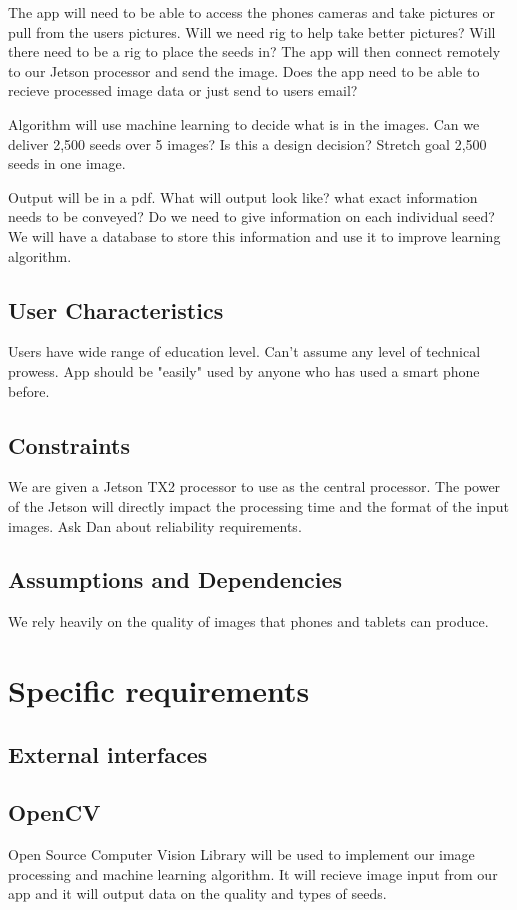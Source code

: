 \documentclass[onecolumn, draftclsnofoot,10pt, compsoc]{IEEEtran}
\begin{document}
The app will need to be able to access the phones cameras and take pictures or pull from the users pictures.
Will we need rig to help take better pictures?
Will there need to be a rig to place the seeds in?
The app will then connect remotely to our Jetson processor and send the image.
Does the app need to be able to recieve processed image data or just send to users email?

Algorithm will use machine learning to decide what is in the images.
Can we deliver 2,500 seeds over 5 images?
Is this a design decision?
Stretch goal 2,500 seeds in one image.

Output will be in a pdf.
What will output look like?
what exact information needs to be conveyed?
Do we need to give information on each individual seed?
We will have a database to store this information and use it to improve learning algorithm.

\subsection{User Characteristics}
Users have wide range of education level.
Can't assume any level of technical prowess.
App should be "easily" used by anyone who has used a smart phone before. %

\subsection{Constraints}
We are given a Jetson TX2 processor to use as the central processor.
The power of the Jetson will directly impact the processing time and the format of the input images.
Ask Dan about reliability requirements.

\subsection{Assumptions and Dependencies}
We rely heavily on the quality of images that phones and tablets can produce.

\section{Specific requirements}
\subsection{External interfaces}
\subsection{OpenCV}
Open Source Computer Vision Library will be used to implement our image processing and machine learning algorithm.
It will recieve image input from our app and it will output data on the quality and types of seeds.
\end{document}
